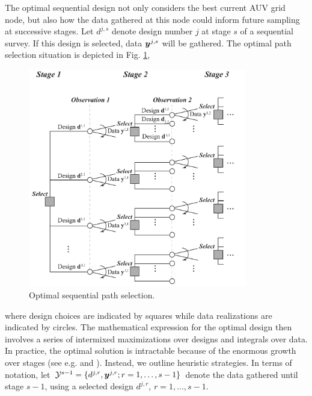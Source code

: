 \documentclass[aoas]{imsart}
\begin{document}
The optimal sequential design not only considers the best current AUV
grid node, but also how the data gathered at this node could inform
future sampling at successive stages. Let $d^{j,s}$ denote design
number $j$ at stage $s$ of a sequential survey. If this design is
selected, data ${\boldsymbol y}^{j,s}$ will be gathered. The optimal path
selection situation is depicted in Fig. \ref{fig:PathSelOpt},
\begin{figure}[b!]
\centering
\includegraphics[width=0.85\textwidth]{Figures/sequent_select.pdf}
\caption{Optimal sequential path selection.}\label{fig:PathSelOpt}
\end{figure}
where design choices are indicated by squares while data realizations are indicated by circles. 
The mathematical expression for the optimal design then involves a
series of intermixed maximizations over designs and integrals over
data.  In practice, the optimal solution is intractable because of
the enormous growth over stages (see
e.g. \cite{sucar2015probabilistic} and \cite{powell2016perspectives}).
Instead, we outline heuristic strategies. In terms of notation, let
$\mathcal{Y}^{s-1} =\{d^{j,r}, {\boldsymbol y}^{j,r} ; r=1,\ldots,s-1 \}$ denote
the data gathered until stage $s-1$, using a selected design
$d^{j,r}$, $r=1,\ldots,s-1$.
\end{document}
